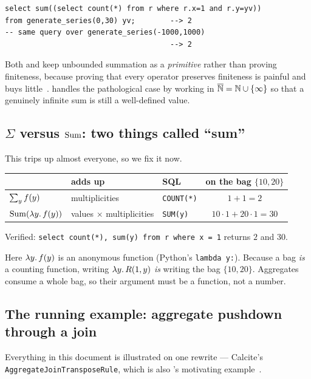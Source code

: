\begin{lstlisting}[style=sql]
select sum((select count(*) from r where r.x=1 and r.y=yv))
from generate_series(0,30) yv;        --> 2
-- same query over generate_series(-1000,1000)
                                      --> 2
\end{lstlisting}

Both \udp{} and \QED{} keep unbounded summation as a \emph{primitive} rather than proving
finiteness, because proving that every operator preserves finiteness is painful and buys
little~\cite[\S3.1]{udp}. \QED{} handles the pathological case by working in
$\overline{\mathbb{N}}=\mathbb{N}\cup\{\infty\}$ so that a genuinely infinite sum is still a well-defined
value.

\subsection{$\Sigma$ versus $\mathrm{Sum}$: two things called ``sum''}

This trips up almost everyone, so we fix it now.

\begin{table}[h]\centering\small
\begin{tabular}{@{}lllc@{}}
\toprule
 & \textbf{adds up} & \textbf{SQL} & \textbf{on the bag $\{10,20\}$} \\
\midrule
$\sum_{y} f(y)$        & multiplicities            & \lstinline|COUNT(*)| & $1+1=2$ \\
$\mathrm{Sum}(\lambda y.\,f(y))$ & values $\times$ multiplicities & \lstinline|SUM(y)|   & $10{\cdot}1+20{\cdot}1=30$ \\
\bottomrule
\end{tabular}
\end{table}

\noindent Verified: \lstinline|select count(*), sum(y) from r where x = 1| returns
$2$ and $30$.

Here $\lambda y.\,f(y)$ is an anonymous function (Python's \texttt{lambda y:}). Because a bag
\emph{is} a counting function, writing $\lambda y.\,R(1,y)$ \emph{is} writing the bag
$\{10,20\}$. Aggregates consume a whole bag, so their argument must be a function, not a
number.

\subsection{The running example: aggregate pushdown through a join}
\label{sec:running}

Everything in this document is illustrated on one rewrite --- Calcite's
\texttt{AggregateJoinTransposeRule}, which is also \QED{}'s motivating example~\cite[\S2]{qed}.

